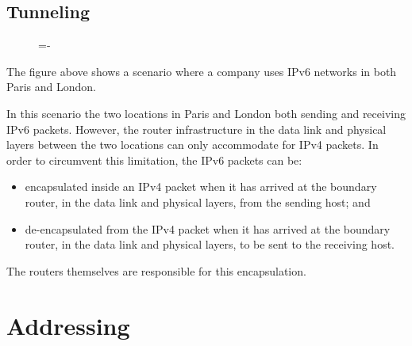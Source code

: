 \documentclass[a4paper]{systems-software}
\begin{document}
\section{Tunneling}

\begin{figure}[H]
	\lineskip=-\fboxrule
\end{figure}

The figure above shows a scenario where a company uses IPv6 networks in both Paris and London.

In this scenario the two locations in Paris and London both sending and receiving IPv6 packets. However, the router infrastructure in the data link and physical layers between the two locations can only accommodate for IPv4 packets. In order to circumvent this limitation, the IPv6 packets can be:
\begin{itemize}
	\item encapsulated inside an IPv4 packet when it has arrived at the boundary router, in the data link and physical layers, from the sending host; and
	\item de-encapsulated from the IPv4 packet when it has arrived at the boundary router, in the data link and physical layers, to be sent to the receiving host.
\end{itemize}

The routers themselves are responsible for this encapsulation.


\chapter{Addressing}
\end{document}
